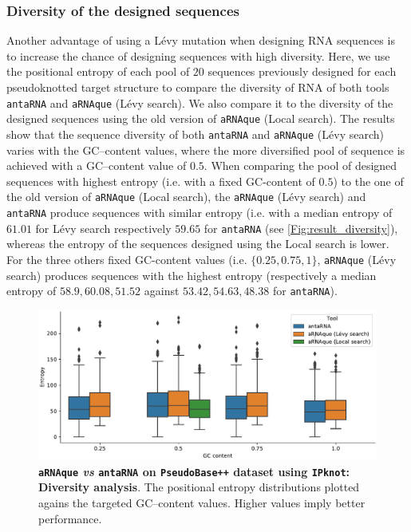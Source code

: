 \subsubsection{Diversity of the designed sequences}
Another advantage of using a Lévy mutation when designing \ac{RNA} sequences is to increase the chance of designing sequences with high diversity. Here, we use the positional entropy of each pool of $20$ sequences previously designed for each pseudoknotted target structure to compare the diversity of \ac{RNA} of both tools \texttt{antaRNA} and \texttt{aRNAque} (Lévy search). We also compare it to the diversity of the designed sequences using the old version of \texttt{aRNAque} (Local search). The results show that the sequence diversity of both \texttt{antaRNA} and \texttt{aRNAque} (Lévy search) varies with the GC--content values, where the more diversified pool of sequence is achieved with a GC--content value of $0.5$. When comparing the pool of designed sequences with highest entropy (i.e. with a fixed GC-content of $0.5$) to the one of the old version of \texttt{aRNAque} (Local search), the \texttt{aRNAque} (Lévy search) and \texttt{antaRNA} produce sequences with similar entropy (i.e. with a median entropy of $61.01$ for Lévy search respectively $59.65$ for \texttt{antaRNA} (see  \autoref{Fig:result_diversity}), whereas the entropy of the sequences designed using the Local search is lower. For the three others fixed GC-content values (i.e. $\{0.25, 0.75, 1 \}$, \texttt{aRNAque} (Lévy search) produces sequences with the highest entropy (respectively a median entropy of $58.9, 60.08, 51.52$ against  $53.42, 54.63, 48.38$ for \texttt{antaRNA}).
\begin{figure}[t!]
	\includegraphics[width=1.0\linewidth]{../res/images/arnaque/fig7.pdf}
	\caption{\textbf{\texttt{aRNAque} \emph{vs} \texttt{antaRNA} on \texttt{PseudoBase++} dataset using \texttt{IPknot}: Diversity analysis}. The positional entropy distributions plotted agains the targeted GC--content values.  Higher values imply better performance.}\label{Fig:result_diversity}
\end{figure}


